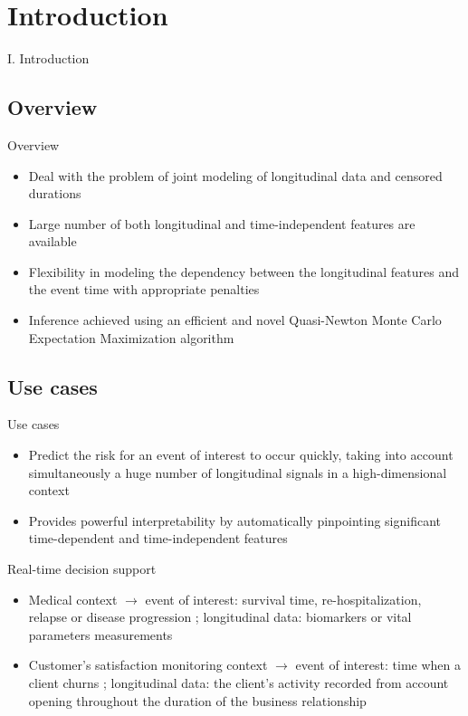 \documentclass{beamer}
\begin{document}
\section{Introduction}

\begin{frame}[noframenumbering]
\Large \centering
\textcolor{blue_pres}{I.} Introduction
\end{frame}

\subsection{Overview}

\begin{frame}{Overview}

\begin{itemize}
  \item Deal with the problem of joint modeling of longitudinal data and censored durations
  \item Large number of both longitudinal and time-independent features are available
  \item Flexibility in modeling the dependency between the longitudinal features and the event time with appropriate penalties
  \item Inference achieved using an efficient and novel Quasi-Newton Monte Carlo Expectation Maximization algorithm
\end{itemize}

\end{frame}

\subsection{Use cases}

\begin{frame}{Use cases}

\small
\begin{itemize}
  \item Predict the risk for an event of interest to occur quickly, taking into account simultaneously a huge number of longitudinal signals in a high-dimensional context
  \item Provides powerful interpretability by automatically pinpointing significant time-dependent and time-independent features
\end{itemize}

\begin{block}{Real-time decision support}
\begin{itemize}
  \item Medical context $\rightarrow$ event of interest: survival time, re-hospitalization, relapse or disease progression ; longitudinal data: biomarkers or vital parameters measurements
  \item Customer's satisfaction monitoring context $\rightarrow$ event of interest: time when a client churns ; longitudinal data: the client's activity recorded from account opening throughout the duration of the business relationship
\end{itemize}
\end{block}

\end{frame}
\end{document}
